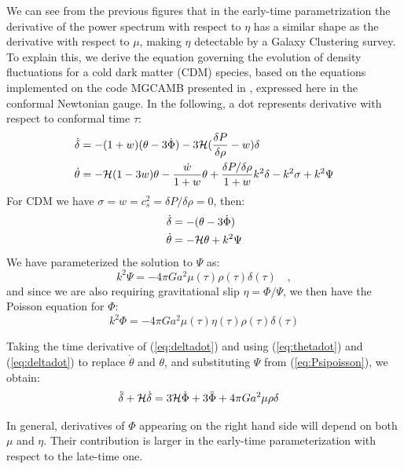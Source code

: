 We can see from the previous figures that in the early-time parametrization the derivative of the power spectrum
with respect to $\eta$ has a similar shape as the derivative with respect to $\mu$, making $\eta$ detectable by a Galaxy Clustering survey.
To explain this, we derive the equation governing the evolution of density fluctuations for a cold dark matter (CDM) species, based on the equations
implemented on the code MGCAMB presented in \cite{hojjati_testing_2011}, expressed here in the conformal Newtonian gauge.
In the following, a dot represents derivative with respect to conformal time $\tau$:
\begin{align}
\dot \delta &= - (1+w)(\theta - 3 \dot \Phi) - 3 \mathcal{H}(\frac{\delta P}{\delta \rho}-w)\delta\\
\dot \theta &= - \mathcal{H} (1-3w)\theta - \frac{\dot w}{1+w} \theta + \frac{\delta P / \delta \rho}{1+w} k^2 \delta - k^2 \sigma + k^2 \Psi
\end{align}
For CDM we have $\sigma = w = c^2_s= \delta P / \delta \rho  = 0$,  then:
\begin{align}
\dot \delta &= -(\theta - 3 \dot \Phi) \label{eq:deltadot}\\
\dot \theta &= -\mathcal{H} \theta + k^2 \Psi \label{eq:thetadot}
\end{align}
We have parameterized the solution to $\Psi$ as:
\begin{equation}\label{eq:Psipoisson}
k^2 \Psi = -4 \pi G a^2 \mu(\tau) \rho(\tau) \delta(\tau) \quad ,
\end{equation}
and since we are also requiring gravitational slip $\eta = \Phi / \Psi$, we then have the Poisson equation for $\Phi$:
\begin{equation}
k^2 \Phi = -4 \pi G a^2 \mu(\tau) \eta(\tau) \rho(\tau) \delta(\tau) \label{eq:Phipoisson}
\end{equation}

Taking the time derivative of (\ref{eq:deltadot}) and using (\ref{eq:thetadot}) and (\ref{eq:deltadot}) to 
replace $\dot \theta$ and $\theta$, and substituting $\Psi$ from (\ref{eq:Psipoisson}), we obtain:
\begin{align}\label{eq:dotdotdelta-mueta}
\ddot{\delta} + \mathcal{H} \dot{\delta} &= 3\mathcal{H} \dot{\Phi} + 3\ddot{\Phi} + 4 \pi G a^2 \mu \rho \delta
\end{align}

In general, derivatives of $\Phi$ appearing on the right hand side will depend on both $\mu$ and $\eta$. Their contribution is larger in the early-time parameterization with respect to the late-time one.


